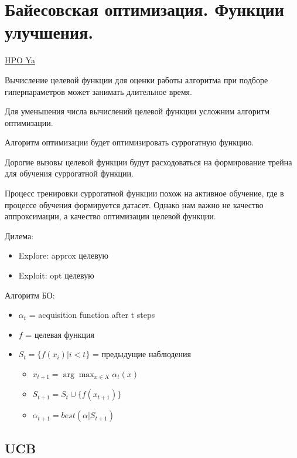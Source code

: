 \section{Байесовская оптимизация. Функции улучшения.}

\href{https://academy.yandex.ru/handbook/ml/article/podbor-giperparametrov}{HPO Ya}

Вычисление целевой функции для оценки работы алгоритма при
подборе гиперпараметров может занимать длительное время.

Для уменьшения числа вычислений целевой функции усложним
алгоритм оптимизации.


Алгоритм оптимизации будет оптимизировать суррогатную функцию.

Дорогие вызовы целевой функции будут расходоваться на формирование
трейна для обучения суррогатной функции.

Процесс тренировки суррогатной функции похож на активное обучение, где в процессе обучения формируется
датасет. Однако нам важно не качество аппроксимации, а качество
оптимизации целевой функции.

Дилема:
\begin{itemize}
    \item Explore: approx целевую
    \item Exploit: opt целевую
\end{itemize}


Алгоритм БО:
\begin{itemize}
    \item $\alpha_t$ = acquisition function after t steps
    \item $f$ = целевая функция
    \item $S_t = \{f(x_i) | i < t\}$ = предыдущие наблюдения
    \begin{itemize}
        \item $x_{t+1} = \arg \max_{x \in X} \alpha_t (x)$
        \item $S_{t+1} = S_{t} \cup \{f(x_{t+1})\}$
        \item $\alpha_{t+1} = best(\alpha | S_{t+1})$
    \end{itemize}
\end{itemize}

\subsection*{UCB}

